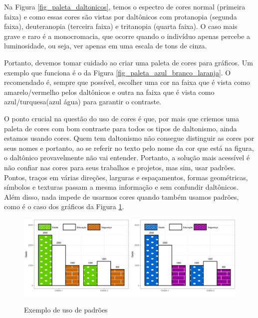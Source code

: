 \documentclass[12pt]{article}   %
\begin{document}
Na Figura \ref{fig_paleta_daltonicos}, temos o espectro de cores normal
(primeira faixa) e como essas cores são vistas por daltônicos com protanopia
(segunda faixa), deuteranopia (terceira faixa) e tritanopia (quarta faixa). O
caso mais grave e raro é a monocromacia, que ocorre quando o indivíduo apenas
percebe a luminosidade, ou seja, ver apenas em uma escala de tons de cinza.
\par Portanto, devemos tomar cuidado ao criar uma paleta de cores para gráficos.
Um exemplo que funciona é o da Figura \ref{fig_paleta_azul_branco_laranja}. O
recomendado é, sempre que possível, escolher uma cor na faixa que é vista como
amarelo/vermelho pelos daltônicos e outra na faixa que é vista como
azul/turquesa(azul água) para garantir o contraste.
\par O ponto crucial na questão do uso de cores é que, por mais que criemos uma
paleta de cores com bom contraste para todos os tipos de daltonismo, ainda
estamos usando cores. Quem tem daltonismo não consegue distinguir as cores por
seus nomes e portanto, ao se referir no texto pelo nome da cor que está na
figura, o daltônico provavelmente não vai entender. Portanto, a solução mais
acessível é não confiar nas cores para seus trabalhos e projetos, mas sim, usar
padrões. Pontos, traços em várias direções, larguras e espaçamentos, formas
geométricas, símbolos e texturas passam a mesma informação e sem confundir
daltônicos. Além disso, nada impede de usarmos cores quando também usamos
padrões, como é o caso dos gráficos da Figura \ref{fig_padroes}.

\begin{figure}[h!]
    \centering
    \caption{Exemplo de uso de padrões}
    \includegraphics[scale=0.3]{padrao}
    \label{fig_padroes}
\end{figure}
\end{document}
